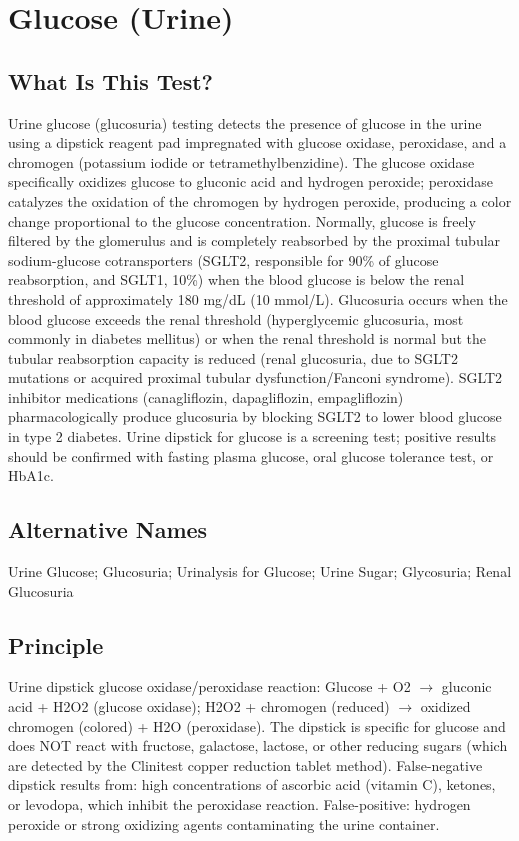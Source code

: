 \chapter{Glucose (Urine)}
\section*{What Is This Test?}
Urine glucose (glucosuria) testing detects the presence of glucose in the urine using a dipstick reagent pad impregnated with glucose oxidase, peroxidase, and a chromogen (potassium iodide or tetramethylbenzidine). The glucose oxidase specifically oxidizes glucose to gluconic acid and hydrogen peroxide; peroxidase catalyzes the oxidation of the chromogen by hydrogen peroxide, producing a color change proportional to the glucose concentration. Normally, glucose is freely filtered by the glomerulus and is completely reabsorbed by the proximal tubular sodium-glucose cotransporters (SGLT2, responsible for 90\% of glucose reabsorption, and SGLT1, 10\%) when the blood glucose is below the renal threshold of approximately 180 mg/dL (10 mmol/L). Glucosuria occurs when the blood glucose exceeds the renal threshold (hyperglycemic glucosuria, most commonly in diabetes mellitus) or when the renal threshold is normal but the tubular reabsorption capacity is reduced (renal glucosuria, due to SGLT2 mutations or acquired proximal tubular dysfunction/Fanconi syndrome). SGLT2 inhibitor medications (canagliflozin, dapagliflozin, empagliflozin) pharmacologically produce glucosuria by blocking SGLT2 to lower blood glucose in type 2 diabetes. Urine dipstick for glucose is a screening test; positive results should be confirmed with fasting plasma glucose, oral glucose tolerance test, or HbA1c.
\section*{Alternative Names}
Urine Glucose; Glucosuria; Urinalysis for Glucose; Urine Sugar; Glycosuria; Renal Glucosuria
\section*{Principle}
Urine dipstick glucose oxidase/peroxidase reaction: Glucose + O2 $\rightarrow$ gluconic acid + H2O2 (glucose oxidase); H2O2 + chromogen (reduced) $\rightarrow$ oxidized chromogen (colored) + H2O (peroxidase). The dipstick is specific for glucose and does NOT react with fructose, galactose, lactose, or other reducing sugars (which are detected by the Clinitest copper reduction tablet method). False-negative dipstick results from: high concentrations of ascorbic acid (vitamin C), ketones, or levodopa, which inhibit the peroxidase reaction. False-positive: hydrogen peroxide or strong oxidizing agents contaminating the urine container.
